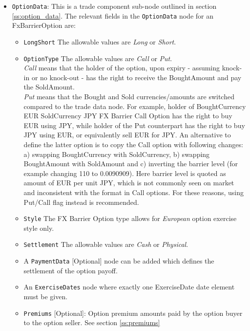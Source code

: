 \begin{itemize}

\item \lstinline!OptionData!: This is a trade component sub-node outlined in section \ref{ss:option_data}. 
The relevant fields in the \lstinline!OptionData! node for an FxBarrierOption are:

\begin{itemize}
\item \lstinline!LongShort! The allowable values are \emph{Long} or \emph{Short}.

\item \lstinline!OptionType! The allowable values are \emph{Call} or \emph{Put}. \\
 \emph{Call} means that the holder of the option, upon expiry - assuming knock-in or no knock-out - has the right to receive the BoughtAmount and pay the SoldAmount. \\\emph{Put} means that the Bought and Sold currencies/amounts are switched compared to the trade data node. 
For example, holder of BoughtCurrency EUR SoldCurrency JPY FX Barrier Call Option has the right to buy EUR using JPY, while
holder of the Put counterpart has the right to buy JPY using EUR, or equivalently sell EUR for JPY. An alternative to define the latter option is to copy the Call option with following changes:\\
a) swapping BoughtCurrency with SoldCurrency, b) swapping BoughtAmount with SoldAmount and c) inverting the barrier level (for example changing 110 to 0.0090909). Here barrier level is
quoted as amount of EUR per unit JPY, which is not commonly seen on market and inconsistent with the format in Call options. For these reasons, using Put/Call flag instead is recommended.

\item  \lstinline!Style! The FX Barrier Option type allows for \emph{European} option exercise style only.

\item  \lstinline!Settlement! The allowable values are \emph{Cash} or \emph{Physical}.

\item A \lstinline!PaymentData! [Optional] node can be added which defines the settlement of the option payoff.

\item An \lstinline!ExerciseDates! node where exactly one ExerciseDate date element must be given.

\item \lstinline!Premiums! [Optional]: Option premium amounts paid by the option buyer to the option seller. See section \ref{ss:premiums}


\end{itemize}
\end{itemize}
